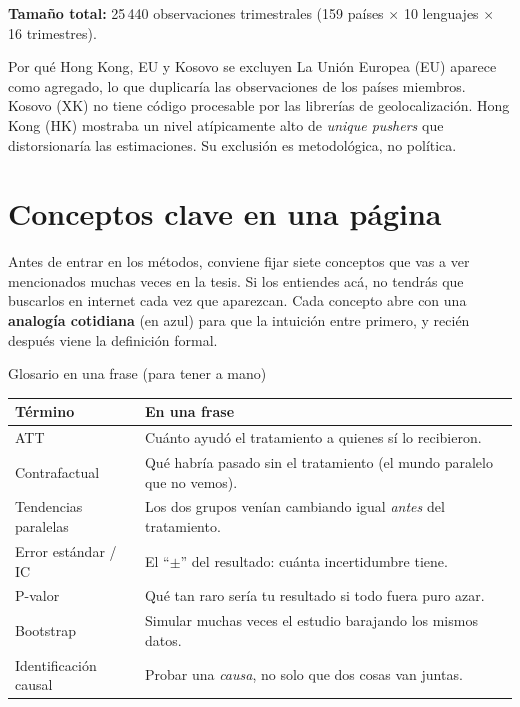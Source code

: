 \documentclass[11pt,a4paper]{article}
\begin{document}
\textbf{Tamaño total:} 25\,440 observaciones trimestrales (159 países $\times$ 10 lenguajes $\times$ 16 trimestres).

\begin{warning}{Por qué Hong Kong{,} EU y Kosovo se excluyen}
La Unión Europea (EU) aparece como agregado, lo que duplicaría las observaciones de los países miembros. Kosovo (XK) no tiene código procesable por las librerías de geolocalización. Hong Kong (HK) mostraba un nivel atípicamente alto de \textit{unique pushers} que distorsionaría las estimaciones. Su exclusión es metodológica, no política.
\end{warning}

\section{Conceptos clave en una página}

Antes de entrar en los métodos, conviene fijar siete conceptos que vas a ver mencionados muchas veces en la tesis. Si los entiendes acá, no tendrás que buscarlos en internet cada vez que aparezcan. Cada concepto abre con una \textbf{analogía cotidiana} (en azul) para que la intuición entre primero, y recién después viene la definición formal.

\begin{lectura}{Glosario en una frase (para tener a mano)}
\renewcommand{\arraystretch}{1.3}
\begin{tabular}{@{}p{4cm}p{9.7cm}@{}}
\textbf{Término} & \textbf{En una frase} \\
\midrule
ATT & Cuánto ayudó el tratamiento a quienes sí lo recibieron. \\
Contrafactual & Qué habría pasado sin el tratamiento (el mundo paralelo que no vemos). \\
Tendencias paralelas & Los dos grupos venían cambiando igual \emph{antes} del tratamiento. \\
Error estándar / IC & El ``$\pm$'' del resultado: cuánta incertidumbre tiene. \\
P-valor & Qué tan raro sería tu resultado si todo fuera puro azar. \\
Bootstrap & Simular muchas veces el estudio barajando los mismos datos. \\
Identificación causal & Probar una \emph{causa}, no solo que dos cosas van juntas. \\
\end{tabular}
\end{lectura}
\end{document}
